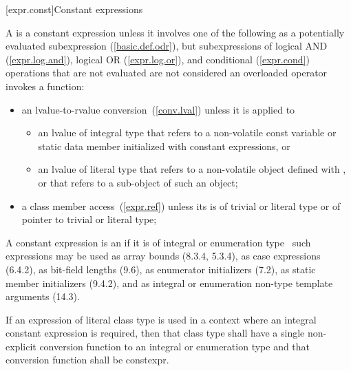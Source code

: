 \documentclass[american]{book}
\begin{document}
\setcounter{section}{18}
[expr.const]{Constant expressions}
\setcounter{Paras}{1}

\pnum
A  is a constant expression
unless it involves one  of the following as a potentially evaluated
subexpression (\ref{basic.def.odr}), but 
subexpressions of logical AND (\ref{expr.log.and}),
logical OR (\ref{expr.log.or}), and conditional (\ref{expr.cond})
operations that are not evaluated are not considered 
\enternote an overloaded operator invokes a function\exitnote:

\begin{itemize}
\item{an lvalue-to-rvalue conversion~(\ref{conv.lval}) unless
it is applied to}
\begin{itemize}
\item{an lvalue of
integral type that refers to a non-volatile const
variable or static data member initialized with constant expressions, or}
\item{an lvalue of
literal type that refers to a non-volatile object
defined with , or that refers to a sub-object
of such an object;}
\end{itemize}
\item{a class member access~(\ref{expr.ref}) unless its
 is of
trivial or
literal type or of
pointer to
trivial or
literal type;}
\end{itemize}

\pnum
A constant expression is an  if
it is of integral or enumeration type  \enternote\ such
expressions may be used as array bounds (8.3.4, 5.3.4), as case
expressions (6.4.2), as bit-field lengths (9.6), as enumerator
initializers (7.2), as static member initializers (9.4.2), and as
integral or enumeration non-type template arguments (14.3). \exitnote\

\pnum
If an expression of
literal class type is used in a context where an 
integral constant expression is required, then that class type shall 
have a single non-explicit conversion function to an integral or enumeration type 
and that conversion function shall be constexpr.
\end{document}

